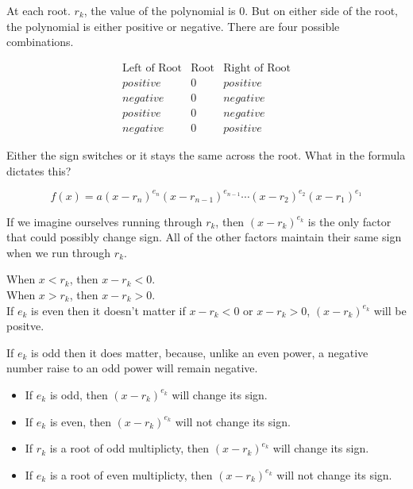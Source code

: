 \documentclass{ximera}
\begin{document}
At each root. $r_k$, the value of the polynomial is $0$.  But on either side of the root, the polynomial is either positive or negative. There are four possible combinations.


\[
\begin{array}{rcl}
\text{Left of Root}  & \text{Root}  & \text{Right of Root} \\
positive & 0 & positive \\
negative & 0 & negative \\
positive & 0 & negative \\
negative & 0 & positive
\end{array}
\]


Either the sign switches or it stays the same across the root.  What in the formula dictates this?



\[   f(x) = a (x-r_n)^{e_n} (x-r_{n-1})^{e_{n-1}}  \cdots (x-r_2)^{e_2} (x-r_1)^{e_1}  \]


If we imagine ourselves running through $r_k$, then $(x-r_k)^{e_k}$ is the only factor that could possibly change sign.  All of the other factors maintain their same sign when we run through $r_k$.


When $x<r_k$, then $x-r_k <0$.  \\

When $x>r_k$, then $x-r_k >0$. \\


If $e_k$ is even then it doesn't matter if $x-r_k <0$ or $x-r_k >0$, $(x-r_k)^{e_k}$ will be positve. 

If $e_k$ is odd then it does matter, because, unlike an even power, a negative number raise to an odd power will remain negative.





\begin{itemize}
\item If $e_k$ is odd, then $(x-r_k)^{e_k}$ will change its sign.
\item If $e_k$ is even, then $(x-r_k)^{e_k}$ will not change its sign.
\end{itemize}







\begin{itemize}
\item If $r_k$ is a root of odd multiplicty, then $(x-r_k)^{e_k}$ will change its sign.
\item If $e_k$ is a root of even multiplicty, then $(x-r_k)^{e_k}$ will not change its sign.
\end{itemize}
\end{document}
